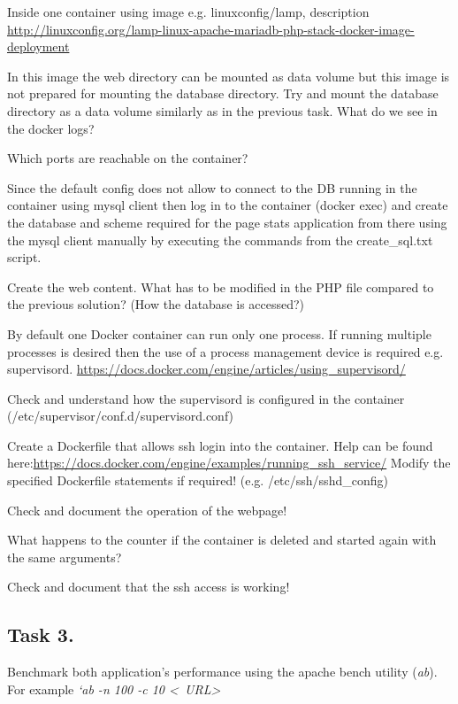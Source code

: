 \documentclass[a4paper]{article}
\begin{document}
Inside one container using image e.g. linuxconfig/lamp, description
\url{http://linuxconfig.org/lamp-linux-apache-mariadb-php-stack-docker-image-deployment}

In this image the web directory can be mounted as data volume but this image is not prepared for mounting the database
directory. Try and mount the database directory as a data volume similarly as in the previous task. What do we see in
the docker logs?

Which ports are reachable on the container?

Since the default config does not allow to connect to the DB running in the container using mysql client then log in to
the container (docker exec) and create the database and scheme required for the page stats application from there using
the mysql client manually by executing the commands from the create\_sql.txt script.

Create the web content. What has to be modified in the PHP file compared to the previous solution? (How the database is
accessed?)

By default one Docker container can run only one process. If running multiple processes is desired then the use of a
process management device is required e.g. supervisord.
\url{https://docs.docker.com/engine/articles/using_supervisord/}

Check and understand how the supervisord is configured in the container 
(/etc/supervisor/conf.d/supervisord.conf)

Create a Dockerfile that allows ssh login into the container. Help can be found
here:\url{https://docs.docker.com/engine/examples/running_ssh_service/} Modify the specified Dockerfile statements if
required! (e.g. /etc/ssh/sshd\_config)

Check and document the operation of the webpage!

What happens to the counter if the container is deleted and started again with the same arguments?

Check and document that the ssh access is working!

\subsection{Task 3.}

Benchmark both application's performance using the apache bench utility (\emph{ab}). For example \emph{`ab -n 100 -c 10
    \textless~URL\textgreater}
\end{document}
